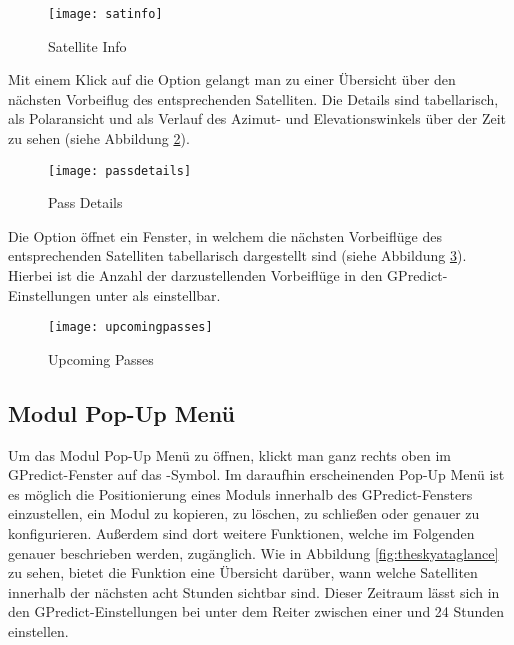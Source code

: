
\begin{figure}[h]
	\centering
	\texttt{[image: satinfo]}
	\caption{Satellite Info}
	\label{fig:satinfo} 
\end{figure}

Mit einem Klick auf die Option  gelangt man zu einer Übersicht über den nächsten Vorbeiflug des entsprechenden Satelliten. Die Details sind tabellarisch, als Polaransicht und als Verlauf des Azimut- und Elevationswinkels über der Zeit zu sehen (siehe Abbildung \ref{fig:passdetails}).

\begin{figure}[h]
	\centering
	\texttt{[image: passdetails]}
	\caption{Pass Details}
	\label{fig:passdetails} 
\end{figure}

\clearpage

Die Option  öffnet ein Fenster, in welchem die nächsten Vorbeiflüge des entsprechenden Satelliten tabellarisch dargestellt sind (siehe Abbildung \ref{fig:upcomingpasses}). Hierbei ist die Anzahl der darzustellenden Vorbeiflüge in den GPredict-Einstellungen unter  als  einstellbar.

\begin{figure}[h]
	\centering
	\texttt{[image: upcomingpasses]}
	\caption{Upcoming Passes}
	\label{fig:upcomingpasses} 
\end{figure}

\vspace{-0.5em}

\subsection{Modul Pop-Up Menü}

Um das Modul Pop-Up Menü zu öffnen, klickt man ganz rechts oben im GPredict-Fenster auf das \myvsymbol-Symbol. Im daraufhin erscheinenden Pop-Up Menü ist es möglich die Positionierung eines Moduls innerhalb des GPredict-Fensters einzustellen, ein Modul zu kopieren, zu löschen, zu schließen oder genauer zu konfigurieren. Außerdem sind dort weitere Funktionen, welche im Folgenden genauer beschrieben werden, zugänglich.\newpar
Wie in Abbildung \ref{fig:theskyataglance} zu sehen, bietet die Funktion  eine Übersicht darüber, wann welche Satelliten innerhalb der nächsten acht Stunden sichtbar sind. Dieser Zeitraum lässt sich in den GPredict-Einstellungen bei  unter dem Reiter  zwischen einer und 24 Stunden einstellen.

